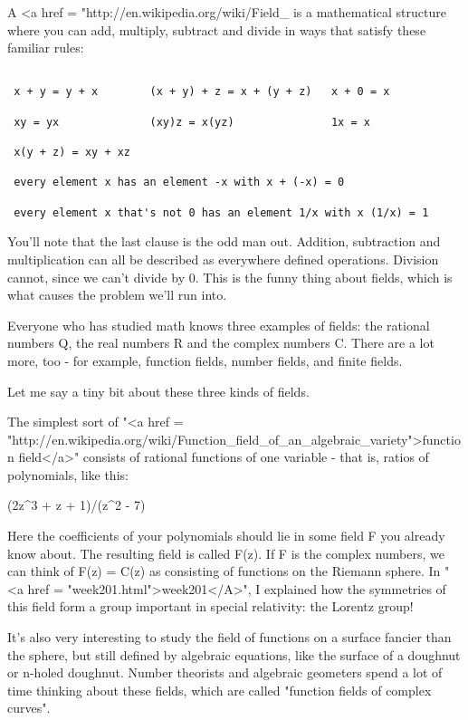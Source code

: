 A <a href = "http://en.wikipedia.org/wiki/Field_%
is a mathematical structure where you can add, multiply,
subtract and divide in ways that satisfy these familiar rules:


\begin{verbatim}

 x + y = y + x        (x + y) + z = x + (y + z)   x + 0 = x

 xy = yx              (xy)z = x(yz)               1x = x

 x(y + z) = xy + xz 

 every element x has an element -x with x + (-x) = 0
 
 every element x that's not 0 has an element 1/x with x (1/x) = 1
\end{verbatim}
    

You'll note that the last clause is the odd man out.  Addition,
subtraction and multiplication can all be described as everywhere
defined operations.  Division cannot, since we can't divide by 0.
This is the funny thing about fields, which is what causes the 
problem we'll run into.

Everyone who has studied math knows three examples of fields: 
the rational numbers Q, the real numbers R and the complex numbers C.  
There are a lot more, too - for example, function fields, number
fields, and finite fields.  

Let me say a tiny bit about these three kinds of fields.

The simplest sort of "<a href =
"http://en.wikipedia.org/wiki/Function_field_of_an_algebraic_variety">function
field</a>" consists of rational functions of one variable - that
is, ratios of polynomials, like this:

(2z^{3} + z + 1)/(z^{2} - 7)

Here the coefficients of your polynomials should lie in some field F
you already know about.  The resulting field is called F(z).  If F is
the complex numbers, we can think of F(z) = C(z) as consisting of
functions on the Riemann sphere.  In "<a href =
"week201.html">week201</A>", I explained how the symmetries of
this field form a group important in special relativity: the Lorentz
group!

It's also very interesting to study the field of functions on a
surface fancier than the sphere, but still defined by algebraic 
equations, like the surface of a doughnut or n-holed doughnut.  
Number theorists and  algebraic geometers spend a lot of time 
thinking about these fields, which are called "function fields 
of complex curves".  

